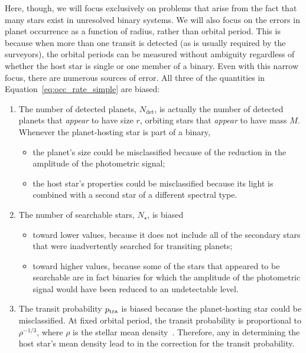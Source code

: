 \documentclass[12pt,modern,trackchanges]{aastex61}
\begin{document}
Here, though, we will focus exclusively on problems that arise from
the fact that many stars exist in unresolved binary systems.  We will
also focus on the errors in planet occurrence as a function of radius,
rather than orbital period. This is because when more than one transit
is detected (as is usually required by the surveyors), the orbital
periods can be measured without ambiguity regardless of whether the
host star is single or one member of a binary.  Even with this narrow
focus, there are numerous sources of error.  All three of the
quantities in Equation~\ref{eq:occ_rate_simple} are biased:
\begin{enumerate}
%    
    \item The number of detected planets, $N_{\det}$, is actually the
      number of detected planets that {\it appear} to have size $r$,
      orbiting stars that {\it appear} to have mass $M$.  Whenever the
      planet-hosting star is part of a binary,
%    
    \begin{itemize}
        \item the planet's size could be misclassified because of the
          reduction in the amplitude of the photometric signal;
%        
        \item the host star's properties could be misclassified
          because its light is combined with a second star of a
          different spectral type.
%        
    \end{itemize}
%    
    \item The number of searchable stars, $N_\star$, is biased
%    
    \begin{itemize}
%        
        \item toward lower values, because it does not include all of
          the secondary stars that were inadvertently searched for
          transiting planets;
%        
        \item toward higher values, because some of the stars that
          appeared to be searchable are in fact binaries for which the
          amplitude of the photometric signal would have been reduced
          to an undetectable level.
%        
    \end{itemize}
%    
    \item The transit probability $p_{\rm tra}$ is biased because the
      planet-hosting star could be misclassified.  At fixed orbital
      period, the transit probability is proportional to
      $\rho^{-1/3}$, where $\rho$ is the stellar mean
      density~\citep{Winn2010}.  Therefore, any 
       in determining
      the host star's mean density lead to 
       in the correction
      for the transit probability.
%    
\end{enumerate}
\end{document}

